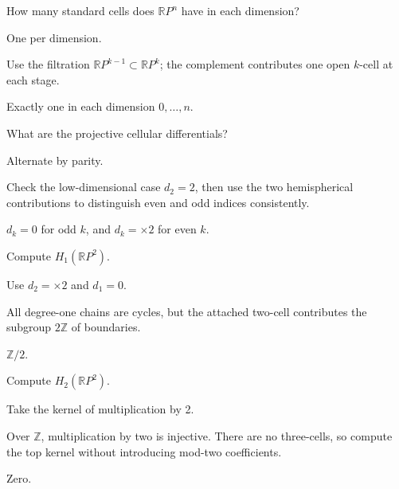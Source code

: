 \begin{exercise}\label{exr:viii18-10}
How many standard cells does \(\mathbb RP^n\) have in each dimension?
\end{exercise}
\begin{hint}
One per dimension.

Use the filtration \(\mathbb RP^{k-1}\subset\mathbb RP^k\); the complement contributes one open \(k\)-cell at each stage.
\end{hint}
\begin{solution}
Exactly one in each dimension \(0,\dots,n\).
\end{solution}

\begin{exercise}\label{exr:viii18-11}
What are the projective cellular differentials?
\end{exercise}
\begin{hint}
Alternate by parity.

Check the low-dimensional case \(d_2=2\), then use the two hemispherical contributions to distinguish even and odd indices consistently.
\end{hint}
\begin{solution}
\(d_k=0\) for odd \(k\), and \(d_k=\times2\) for even \(k\).
\end{solution}

\begin{exercise}\label{exr:viii18-12}
Compute \(H_1(\mathbb RP^2)\).
\end{exercise}
\begin{hint}
Use \(d_2=\times2\) and \(d_1=0\).

All degree-one chains are cycles, but the attached two-cell contributes the subgroup \(2\mathbb Z\) of boundaries.
\end{hint}
\begin{solution}
\(\mathbb Z/2\).
\end{solution}

\begin{exercise}\label{exr:viii18-13}
Compute \(H_2(\mathbb RP^2)\).
\end{exercise}
\begin{hint}
Take the kernel of multiplication by 2.

Over \(\mathbb Z\), multiplication by two is injective. There are no three-cells, so compute the top kernel without introducing mod-two coefficients.
\end{hint}
\begin{solution}
Zero.
\end{solution}

